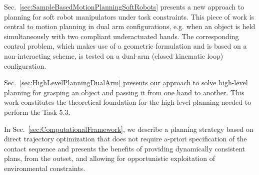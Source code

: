 \documentclass[a4paper,11pt,pdf]{pacmanreport}
\begin{document}
Sec.~\ref{sec:SampleBasedMotionPlanningSoftRobots} presents a new approach to planning for soft robot manipulators under task constraints. This piece of work is central to motion planning in dual arm configurations, e.g. when an object is held simultaneously with two compliant underactuated hands. The corresponding control problem, which makes use of a geometric formulation and is based on a non-interacting scheme, is tested on a dual-arm (closed kinematic loop) configuration.

Sec.~\ref{sec:HighLevelPlanningDualArm} presents our approach to solve high-level planning for grasping an object and passing it from one hand to another. This work constitutes the theoretical foundation for the high-level planning needed to perform the Task 5.3.

In Sec.~\ref{sec:ComputationalFramework}, we describe a planning strategy based on direct trajectory optimization that does not require a-priori specification of the contact sequence and presents the benefits of providing dynamically consistent plans, from the outset, and allowing for opportunistic exploitation of environmental constraints.










\end{document}
